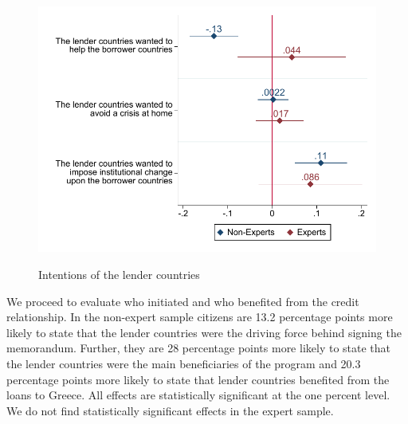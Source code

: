  \begin{figure}[H]
\begin{center}
     \caption{Intentions of the lender countries}
    
     \includegraphics[scale=0.8]{Question2_base.pdf}
     \label{fig:my_label}
      \end{center}
      \tiny
\end{figure}
We proceed to evaluate who initiated and who benefited from the credit relationship. 
In the non-expert sample citizens are 13.2 percentage points more likely to state that the lender countries were the driving force behind signing the memorandum. Further, they are 28 percentage points more likely to state that the lender countries were the main beneficiaries of the program and 20.3 percentage points more likely to state that lender countries benefited from the loans to Greece. All effects are statistically significant at the one percent level. We do not find statistically significant effects in the expert sample. \\
